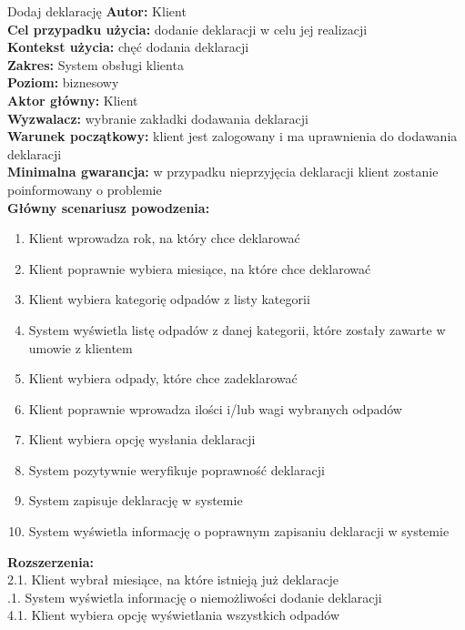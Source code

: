 \begin{usecase}{Dodaj deklarację}
	\textbf{Autor:} Klient \\
	\textbf{Cel przypadku użycia:} dodanie deklaracji w celu jej realizacji \\
	\textbf{Kontekst użycia:} chęć dodania deklaracji \\
	\textbf{Zakres:} System obsługi klienta \\
	\textbf{Poziom:} biznesowy \\
	\textbf{Aktor główny:} Klient \\
	\textbf{Wyzwalacz:} wybranie zakładki dodawania deklaracji \\
	\textbf{Warunek początkowy:} klient jest zalogowany i ma uprawnienia do dodawania deklaracji \\
	\textbf{Minimalna gwarancja:} w przypadku nieprzyjęcia deklaracji klient zostanie poinformowany o problemie \\
	\textbf{Główny scenariusz powodzenia:} \\
		\begin{enumerate}
			\item Klient wprowadza rok, na który chce deklarować
			\item Klient poprawnie wybiera miesiące, na które chce deklarować
			\item Klient wybiera kategorię odpadów z listy kategorii
			\item System wyświetla listę odpadów z danej kategorii, które zostały zawarte w umowie z klientem
			\item Klient wybiera odpady, które chce zadeklarować
			\item Klient poprawnie wprowadza ilości i/lub wagi wybranych odpadów
			\item Klient wybiera opcję wysłania deklaracji
			\item System pozytywnie weryfikuje poprawność deklaracji
			\item System zapisuje deklarację w systemie
			\item System wyświetla informację o poprawnym zapisaniu deklaracji w systemie
		\end{enumerate}
	\textbf{Rozszerzenia:} \\
		2.1. Klient wybrał miesiące, na które istnieją już deklaracje \\
			.1. System wyświetla informację o niemożliwości dodanie deklaracji \\
		4.1. Klient wybiera opcję wyświetlania wszystkich odpadów \\

\end{usecase}
